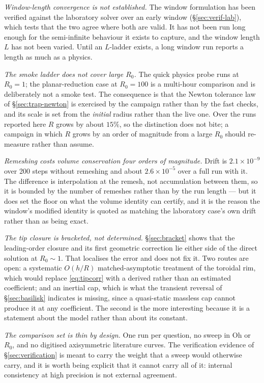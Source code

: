 \documentclass[11pt,a4paper]{article}
\newcommand{\Oh}{\mathrm{Oh}}
\begin{document}
\emph{Window-length convergence is not established.} The window formulation has
been verified against the laboratory solver over an early window
(\S\ref{sec:verif-lab}), which tests that the two agree where both are valid. It
has not been run long enough for the semi-infinite behaviour it exists to
capture, and the window length $L$ has not been varied. Until an $L$-ladder
exists, a long window run reports a length as much as a physics.

\emph{The smoke ladder does not cover large $R_{0}$.} The quick physics probe
runs at $R_{0}=1$; the planar-reduction case at $R_{0}=100$ is a multi-hour
comparison and is deliberately not a smoke test. The consequence is that the
Newton tolerance law of \S\ref{sec:trap-newton} is exercised by the campaign
rather than by the fast checks, and its scale is set from the \emph{initial}
radius rather than the live one. Over the runs reported here $R$ grows by about
$15\%$, so the distinction does not bite; a campaign in which $R$ grows by an
order of magnitude from a large $R_{0}$ should re-measure rather than assume.

\emph{Remeshing costs volume conservation four orders of magnitude.} Drift is
$2.1\times10^{-9}$ over 200 steps without remeshing and about
$2.6\times10^{-5}$ over a full run with it. The difference is interpolation at
the remesh, not accumulation between them, so it is bounded by the number of
remeshes rather than by the run length --- but it does set the floor on what the
volume identity can certify, and it is the reason the window's modified identity
is quoted as matching the laboratory case's own drift rather than as being
exact.

\emph{The tip closure is bracketed, not determined.} \S\ref{sec:bracket} shows
that the leading-order closure and its first geometric correction lie either
side of the direct solution at $R_{0}\sim1$. That localises the error and does
not fix it. Two routes are open: a systematic $O(h/R)$ matched-asymptotic
treatment of the toroidal rim, which would replace \eqref{eq:tipcorr} with a
derived rather than an estimated coefficient; and an inertial cap, which is what
the transient reversal of \S\ref{sec:basilisk} indicates is missing, since a
quasi-static massless cap cannot produce it at any coefficient. The second is
the more interesting because it is a statement about the model rather than about
its constant.

\emph{The comparison set is thin by design.} One run per question, no sweep in
$\Oh$ or $R_{0}$, and no digitised axisymmetric literature curves. The
verification evidence of \S\ref{sec:verification} is meant to carry the weight
that a sweep would otherwise carry, and it is worth being explicit that it
cannot carry all of it: internal consistency at high precision is not external
agreement.
\end{document}
